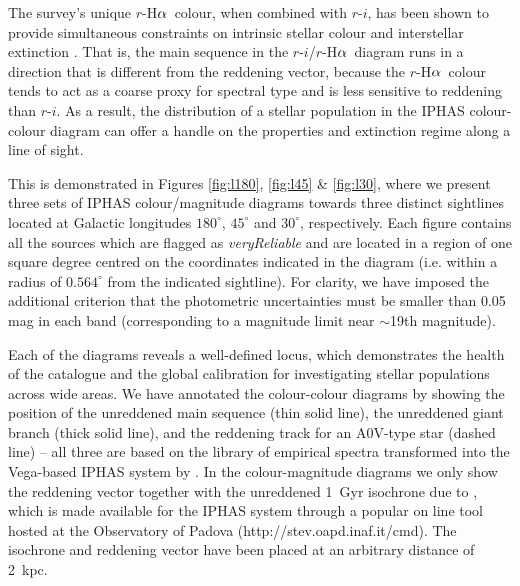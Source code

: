 \documentclass[useAMS,usenatbib]{mn2e}
\def\ha{\mbox{H$\rm \alpha$}}
\begin{document}
The survey's unique $r$-\ha\ colour,
when combined with $r$-$i$,
has been shown to provide simultaneous constraints 
on intrinsic stellar colour and interstellar extinction \citep{Drew2008}. 
That is, the main sequence in the $r$-$i$/$r$-\ha\ diagram
runs in a direction that is different from the reddening vector,
because the $r$-\ha\ colour tends to act
as a coarse proxy for spectral type
and is less sensitive to reddening than $r$-$i$.
As a result, the distribution of a stellar population
in the IPHAS colour-colour diagram
can offer a handle on the properties and extinction regime
along a line of sight.

This is demonstrated 
in Figures \ref{fig:l180}, \ref{fig:l45} \& \ref{fig:l30},
where we present three sets of IPHAS colour/magnitude diagrams
towards three distinct sightlines
located at Galactic longitudes 
$180^\circ$, $45^\circ$ and $30^\circ$, respectively.
Each figure contains all the sources
which are flagged as \emph{veryReliable}
and are located in a region of one square degree 
centred on the coordinates indicated in the diagram
(i.e. within a radius of $0.564^\circ$ from the indicated sightline).
For clarity, we have imposed the additional criterion
that the photometric uncertainties
must be smaller than 0.05 mag in each band
(corresponding to a magnitude limit near $\sim$19th magnitude).

Each of the diagrams reveals a well-defined locus,
which demonstrates the health of the catalogue and the global calibration
for investigating stellar populations across wide areas.
We have annotated the colour-colour diagrams
by showing the position 
of the unreddened main sequence (thin solid line),
the unreddened giant branch (thick solid line),
and the reddening track for an A0V-type star (dashed line)
-- all three are based on the \cite{Pickles1998} library 
of empirical spectra
transformed into the Vega-based IPHAS system by \cite{Drew2005}.
In the colour-magnitude diagrams we only show the reddening vector
together with the unreddened 1~Gyr isochrone due to \cite{Bressan2012},
which is made available for the IPHAS system through a
popular on line tool hosted at the Observatory of Padova
(http://stev.oapd.inaf.it/cmd).
The isochrone and reddening vector have been placed
at an arbitrary distance of 2~kpc.
\end{document}
